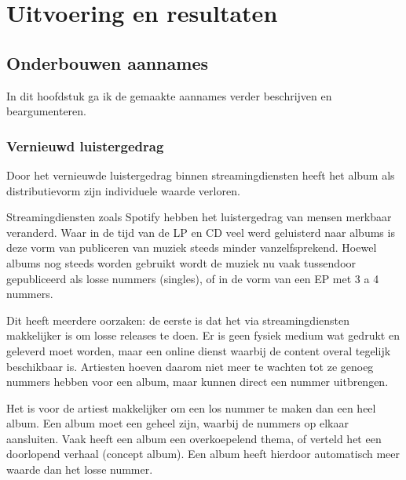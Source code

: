 \section{Uitvoering en resultaten}

\subsection{Onderbouwen aannames}

In dit hoofdstuk ga ik de gemaakte aannames verder beschrijven en beargumenteren.

\subsubsection*{Vernieuwd luistergedrag}

\begin{quotebox}
Door het vernieuwde luistergedrag binnen streamingdiensten heeft het album als distributievorm zijn individuele waarde verloren.
\end{quotebox}
Streamingdiensten zoals Spotify hebben het luistergedrag van mensen merkbaar veranderd. Waar in de tijd van de LP en CD veel werd geluisterd naar albums is deze vorm van publiceren van muziek steeds minder vanzelfsprekend. Hoewel albums nog steeds worden gebruikt wordt de muziek nu vaak tussendoor gepubliceerd als losse nummers (singles), of in de vorm van een EP met 3 a 4 nummers.

Dit heeft meerdere oorzaken: de eerste is dat het via streamingdiensten makkelijker is om losse releases te doen. Er is geen fysiek medium wat gedrukt en geleverd moet worden, maar een online dienst waarbij de content overal tegelijk beschikbaar is. Artiesten hoeven daarom niet meer te wachten tot ze genoeg nummers hebben voor een album, maar kunnen direct een nummer uitbrengen.

Het is voor de artiest makkelijker om een los nummer te maken dan een heel album. Een album moet een geheel zijn, waarbij de nummers op elkaar aansluiten. Vaak heeft een album een overkoepelend thema, of verteld het een doorlopend verhaal (concept album). Een album heeft hierdoor automatisch meer waarde dan het losse nummer. 

